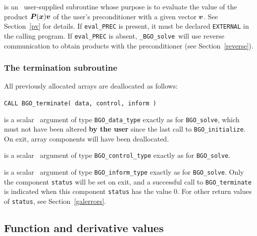 \documentclass{galahad}
\newcommand{\packagename}{BGO}
\newcommand{\fullpackagename}{\libraryname\_\packagename}
\newcommand{\solver}{{\tt \fullpackagename\_solve}}
\begin{document}
\begin{description}
 is an \optional\
user-supplied subroutine whose purpose is to evaluate the value of the
product ${\bm{P}}({\bm{x}}){\bm{v}}$ of the user's preconditioner with a given vector
${\bm{v}}$. See Section~\ref{pv} for details.
If {\tt eval\_PREC} is present,
it must be declared {\tt EXTERNAL} in the calling program.
If {\tt eval\_PREC} is absent, \solver\ will use reverse communication to
obtain products with the preconditioner (see Section~\ref{reverse}).

\end{description}


\subsubsection{The  termination subroutine}
All previously allocated arrays are deallocated as follows:
\vspace*{1mm}

\hspace{8mm}
{\tt CALL \packagename\_terminate( data, control, inform )}

\vspace*{-1mm}
\begin{description}

 is a scalar \intentinout\ argument of type
{\tt \packagename\_data\_type}
exactly as for
{\tt \packagename\_solve},
which must not have been altered {\bf by the user} since the last call to
{\tt \packagename\_initialize}.
On exit, array components will have been deallocated.

 is a scalar \intentin\ argument of type
{\tt \packagename\_control\_type}
exactly as for
{\tt \packagename\_solve}.

 is a scalar \intentout\ argument of type
{\tt \packagename\_inform\_type}
exactly as for
{\tt \packagename\_solve}.
Only the component {\tt status} will be set on exit, and a
successful call to
{\tt \packagename\_terminate}
is indicated when this  component {\tt status} has the value 0.
For other return values of {\tt status}, see Section~\ref{galerrors}.

\end{description}


\subsection{Function and derivative values\label{fdv}}
\end{document}
